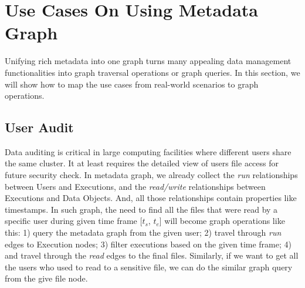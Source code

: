 \section{Use Cases On Using Metadata Graph}

Unifying rich metadata into one graph turns many appealing data management functionalities into graph traversal operations or graph queries. In this section, we will show how to map the use cases from real-world scenarios to graph operations.

\subsection{User Audit}

Data auditing is critical in large computing facilities where different users share the same cluster. It at least requires the detailed view of users file access for future security check. In metadata graph, we already collect the \textit{run} relationships between Users and Executions, and the \textit{read/write} relationships between Executions and Data Objects. And, all those relationships contain properties like timestamps. In such graph, the need to find all the files that were read by a specific user during given time frame [$t_s$, $t_e$] will become graph operations like this: 1) query the metadata graph from the given user; 2) travel through \textit{run} edges to Execution nodes; 3) filter executions based on the given time frame; 4) and travel through the \textit{read} edges to the final files. Similarly, if we want to get all the users who used to read to a sensitive file, we can do the similar graph query from the give file node.





